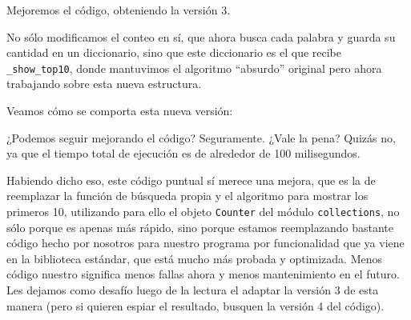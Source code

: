 Mejoremos el código, obteniendo la versión 3.


No sólo modificamos el conteo en sí, que ahora busca cada palabra y guarda su cantidad en un diccionario, sino que este diccionario es el que recibe \texttt{\_show\_top10}, donde mantuvimos el algoritmo ``absurdo'' original pero ahora trabajando sobre esta nueva estructura.

Veamos cómo se comporta esta nueva versión:


¿Podemos seguir mejorando el código? Seguramente. ¿Vale la pena? Quizás no, ya que el tiempo total de ejecución es de alrededor de 100 milisegundos. 

Habiendo dicho eso, este código puntual sí merece una mejora, que es la de reemplazar la función de búsqueda propia y el algoritmo para mostrar los primeros 10, utilizando para ello el objeto \texttt{Counter} del módulo \texttt{collections}, no sólo porque es apenas más rápido, sino porque estamos reemplazando bastante código hecho por nosotros para nuestro programa por funcionalidad que ya viene en la biblioteca estándar, que está mucho más probada y optimizada. Menos código nuestro significa menos fallas ahora y menos mantenimiento en el futuro. Les dejamos como desafío luego de la lectura el adaptar la versión 3 de esta manera (pero si quieren espiar el resultado, busquen la versión 4 del código).

